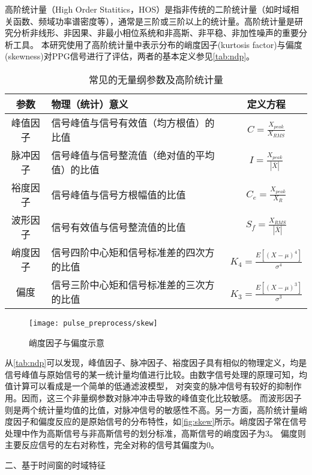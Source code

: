 高阶统计量（High Order Statitics，HOS）是指非传统的二阶统计量（如时域相关函数、频域功率谱密度等），通常是三阶或三阶以上的统计量\cite{Zhang2002,Tu2013}。高阶统计量是研究分析非线形、非因果、非最小相位系统和非高斯、非平稳、非加性噪声的重要分析工具。
本研究使用了高阶统计量中表示分布的峭度因子(kurtosis factor)与偏度(skewness)对PPG信号进行了评估，两者的基本定义参见\autoref{tab:ndp}。
\begin{table}[htbp]
    \centering
    \caption{\label{tab:ndp}常见的无量纲参数及高阶统计量}
    \begin{tabularx}{\linewidth}{cX<{\centering}c}
        \toprule
        \textbf{参数}&\textbf{物理（统计）意义}&\textbf{定义方程}\\
        \midrule
        峰值因子&信号峰值与信号有效值（均方根值）的比值& $C=\frac{X_{peak}}{X_{RMS}}$      \\
        脉冲因子&信号峰值与信号整流值（绝对值的平均值）的比值&$I=\frac{X_{peak}}{|\bar{X}|}$      \\
        裕度因子&信号峰值与信号方根幅值的比值&$C_e=\frac{X_{peak}}{X_R}$       \\
        波形因子&信号有效值与信号整流值的比值&$S_f=\frac{X_{RMS}}{|\bar{X}|}$      \\
        峭度因子&信号四阶中心矩和信号标准差的四次方的比值&$K_4=\frac{E[(X-\mu)^4]}{\sigma^4}$      \\
        偏度&信号三阶中心矩和信号标准差的三次方的比值&$K_3=\frac{E[(X-\mu)^3]}{\sigma^3}$      \\
        \bottomrule
    \end{tabularx}
\end{table}
\begin{figure}[htbp]
    \centering
    \texttt{[image: pulse\_preprocess/skew]}
    \caption{\label{fig:skew}峭度因子与偏度示意}
\end{figure}

从\autoref{tab:ndp}可以发现，峰值因子、脉冲因子、裕度因子具有相似的物理定义，均是信号峰值与原始信号的某一统计量均值进行比较。由数字信号处理的原理可知，均值计算可以看成是一个简单的低通滤波模型，
对突变的脉冲信号有较好的抑制作用。因而，这三个非量纲参数对脉冲冲击导致的峰值变化比较敏感。
而波形因子则是两个统计量均值的比值，对脉冲信号的敏感性不高。另一方面，高阶统计量峭度因子和偏度反应的是原始信号的分布特性，如\autoref{fig:skew}所示。峭度因子常在信号处理中作为高斯信号与非高斯信号的划分标准，高斯信号的峭度因子为3。
偏度则主要反应信号的左右对称性，完全对称的信号其偏度为0。

二、基于时间窗的时域特征

